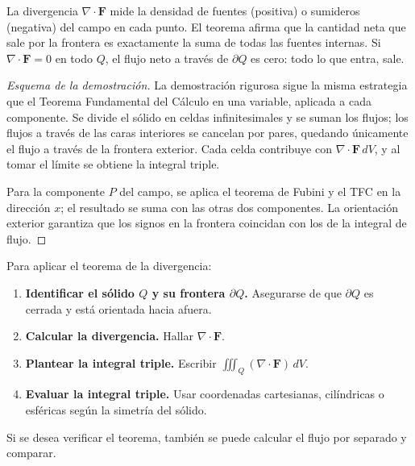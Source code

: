 \begin{rem}
La divergencia $\nabla\cdot\mathbf{F}$ mide la densidad de fuentes (positiva) o sumideros (negativa) del campo en cada punto. El teorema afirma que la cantidad neta que sale por la frontera es exactamente la suma de todas las fuentes internas. Si $\nabla\cdot\mathbf{F}=0$ en todo $Q$, el flujo neto a través de $\partial Q$ es cero: todo lo que entra, sale.
\end{rem}

\begin{proof}[Esquema de la demostración]
La demostración rigurosa sigue la misma estrategia que el Teorema Fundamental del Cálculo en una variable, aplicada a cada componente. Se divide el sólido en celdas infinitesimales y se suman los flujos; los flujos a través de las caras interiores se cancelan por pares, quedando únicamente el flujo a través de la frontera exterior. Cada celda contribuye con $\nabla\cdot\mathbf{F}\,dV$, y al tomar el límite se obtiene la integral triple. 
\par
Para la componente $P$ del campo, se aplica el teorema de Fubini y el TFC en la dirección $x$; el resultado se suma con las otras dos componentes. La orientación exterior garantiza que los signos en la frontera coincidan con los de la integral de flujo.
\end{proof}

\begin{pasos}
Para aplicar el teorema de la divergencia:
\begin{enumerate}
\item \textbf{Identificar el sólido $Q$ y su frontera $\partial Q$.} Asegurarse de que $\partial Q$ es cerrada y está orientada hacia afuera.
\item \textbf{Calcular la divergencia.} Hallar $\nabla\cdot\mathbf{F}$.
\item \textbf{Plantear la integral triple.} Escribir $\iiint_Q (\nabla\cdot\mathbf{F})\,dV$.
\item \textbf{Evaluar la integral triple.} Usar coordenadas cartesianas, cilíndricas o esféricas según la simetría del sólido.
\end{enumerate}
Si se desea verificar el teorema, también se puede calcular el flujo por separado y comparar.
\end{pasos}

